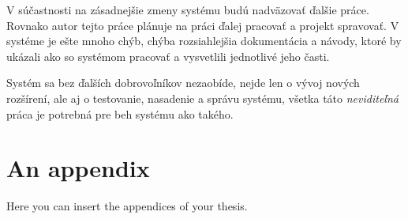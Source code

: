 \documentclass[
  digital, %
  twoside, %
  table,   %
  lof,     %
  lot,     %
]{fithesis3}
\begin{document}
V súčastnosti na zásadnejšie zmeny systému budú nadväzovať ďalšie práce. Rovnako autor tejto práce plánuje na práci ďalej pracovať a projekt spravovať. V systéme je ešte mnoho chýb, chýba rozsiahlejšia dokumentácia a návody, ktoré by ukázali ako so systémom pracovať a vysvetlili jednotlivé jeho časti.

Systém sa bez ďalších dobrovoľníkov nezaobíde, nejde len o vývoj nových rozšírení, ale aj o testovanie, nasadenie a správu systému, všetka táto \emph{neviditeľná} práca je potrebná pre beh systému ako takého.




\appendix %
\chapter{An appendix}
Here you can insert the appendices of your thesis.
\end{document}
